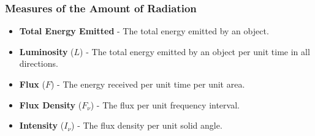 \documentclass[handout, %
	11pt, %
]{beamer}
\begin{document}
\begin{frame}
    \frametitle{Measures of the Amount of Radiation}
    \begin{itemize}
        \item \textbf{Total Energy Emitted} - The total energy emitted by an object.
        \item \textbf{Luminosity} ($L$) - The total energy emitted by an object per unit time in all directions.
        \item \textbf{Flux} ($F$) - The energy received per unit time per unit area.
        \item \textbf{Flux Density} ($F_{\nu}$) - The flux per unit frequency interval.
        \item \textbf{Intensity} ($I_{\nu}$) - The flux density per unit solid angle.
    \end{itemize}
\end{frame}

\end{document}
